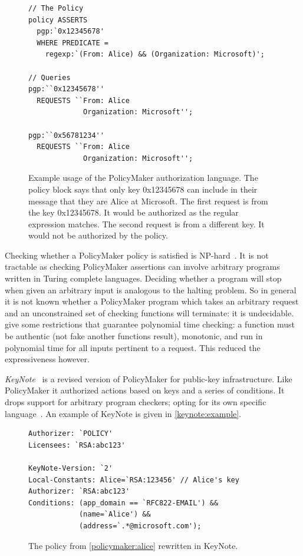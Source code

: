 \documentclass[a4paper,sfsidenotes]{%
  article%
}
\begin{document}
\begin{figure}\label{policymaker:alice}
\begin{lstlisting}[language=PolicyMaker]
// The Policy
policy ASSERTS
  pgp:`0x12345678'
  WHERE PREDICATE =
    regexp:`(From: Alice) && (Organization: Microsoft)';

// Queries
pgp:``0x12345678''
  REQUESTS ``From: Alice
             Organization: Microsoft'';

pgp:``0x56781234''
  REQUESTS ``From: Alice
             Organization: Microsoft'';
\end{lstlisting}
  \caption{Example usage of the PolicyMaker authorization language.      
    The policy block says that only key 0x12345678 can include in their message
    that they are Alice at Microsoft.  
    The first request is from the key 0x12345678. It would be authorized as the
    regular expression matches.  
    The second request is from a different key.  It would not be authorized by the
    policy.} 
\label{sec:pollang}
\end{figure}

Checking whether a PolicyMaker policy is satisfied is
NP-hard~\cite{Blaze:1998fq}.  It is not tractable as checking PolicyMaker
assertions can involve arbitrary programs written in Turing complete languages.
Deciding whether a program will stop when given an arbitrary input is analogous
to the halting problem.  So in general it is not known whether a PolicyMaker
program which takes an arbitrary request and an unconstrained set of checking
functions will terminate: it is undecidable.  \citeauthor{Blaze:1998fq} give some
restrictions that guarantee polynomial time checking: a function must be
authentic (not fake another functions result), monotonic, and run in polynomial
time for all inputs pertinent to a request.  This reduced the expressiveness
however.

\emph{KeyNote}~\cite{Blaze:1999fa} is a revised version of PolicyMaker
for public-key infrastructure.  Like PolicyMaker it authorized actions based on
keys and a series of conditions.  It drops support for arbitrary program
checkers; opting for its own specific language~\cite{Blaze:1999vc}.  An example
of KeyNote is given in \autoref{keynote:example}. 

\begin{figure}
  \begin{lstlisting}[language=KeyNote]
Authorizer: `POLICY'
Licensees: `RSA:abc123'

KeyNote-Version: `2'
Local-Constants: Alice=`RSA:123456' // Alice's key
Authorizer: `RSA:abc123'
Conditions: (app_domain == `RFC822-EMAIL') &&
            (name=`Alice') &&
            (address=`.*@microsoft.com');
  \end{lstlisting}
  \caption{The policy from \autoref{policymaker:alice} rewritten in KeyNote.}
  
\label{keynote:example}
\end{figure}
\end{document}
